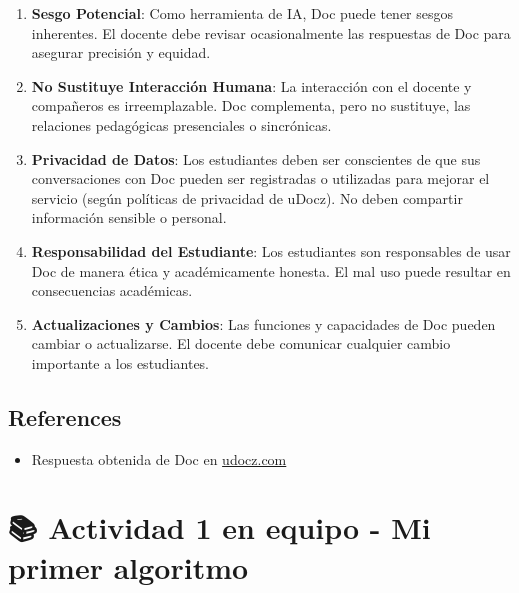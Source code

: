 \documentclass[
  spanish,
  12pt,
  letterpaper,
  DIV=11,
  numbers=noendperiod]{scrreprt}
\providecommand{\tightlist}{%
  \setlength{\itemsep}{0pt}\setlength{\parskip}{0pt}}
\begin{document}
\begin{enumerate}
  \begin{itemize}
  \tightlist
  \item
    Proporcionar asesoramiento médico, legal o psicológico
  \item
    Reemplazar servicios de apoyo estudiantil especializados
  \item
    Manejar situaciones de crisis o emergencia
  \end{itemize}
\item
  \textbf{Sesgo Potencial}: Como herramienta de IA, Doc puede tener
  sesgos inherentes. El docente debe revisar ocasionalmente las
  respuestas de Doc para asegurar precisión y equidad.
\item
  \textbf{No Sustituye Interacción Humana}: La interacción con el
  docente y compañeros es irreemplazable. Doc complementa, pero no
  sustituye, las relaciones pedagógicas presenciales o sincrónicas.
\item
  \textbf{Privacidad de Datos}: Los estudiantes deben ser conscientes de
  que sus conversaciones con Doc pueden ser registradas o utilizadas
  para mejorar el servicio (según políticas de privacidad de uDocz). No
  deben compartir información sensible o personal.
\item
  \textbf{Responsabilidad del Estudiante}: Los estudiantes son
  responsables de usar Doc de manera ética y académicamente honesta. El
  mal uso puede resultar en consecuencias académicas.
\item
  \textbf{Actualizaciones y Cambios}: Las funciones y capacidades de Doc
  pueden cambiar o actualizarse. El docente debe comunicar cualquier
  cambio importante a los estudiantes.
\end{enumerate}

\section{References}\label{references-2}

\begin{itemize}
\tightlist
\item
  Respuesta obtenida de Doc en \href{https://www.udocz.com/}{udocz.com}
\end{itemize}

\chapter{\texorpdfstring{\textbf{📚} \textbf{Actividad 1 en equipo -} Mi
primer
algoritmo}{📚 Actividad 1 en equipo - Mi primer algoritmo}}\label{actividad-1-en-equipo---mi-primer-algoritmo}
\end{document}
